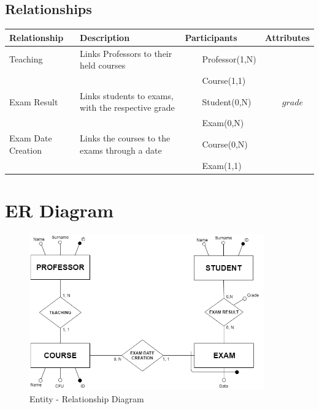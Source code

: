 \documentclass{report}
\newcommand{\tabitem}{~~\llap{\textbullet}~~}
\begin{document}
\subsection*{Relationships}
\begin{table}[h]
	\centering
	\begin{tabular}{| m{6em} | m{14em} | m{8em} | m{7em} |}
		\hline
		\textbf{Relationship} & \textbf{Description} & \textbf{Participants} & \textbf{Attributes} \\
		\hline
		Teaching & Links Professors to their held courses & 
		\tabitem Professor(1,N) & \\ & &
		\tabitem Course(1,1) & \\
		\hline
		Exam Result & Links students to exams, with the respective grade & 
		\tabitem Student(0,N) & \tabitem $grade$ \\ & &
		\tabitem Exam(0,N) & \\
		\hline
		Exam Date Creation & Links the courses to the exams through a date & 
		\tabitem Course(0,N) & \\ & & 
		\tabitem Exam(1,1) & \\
		\hline
	\end{tabular}
\end{table}
\vspace{5em}
\newpage
\section*{ER Diagram}
\vspace{2em}
\begin{figure}[ht]
	\includegraphics[width=0.9\textwidth]{ER_Diagram.png}
	\caption{Entity - Relationship Diagram}
\end{figure}
\end{document}
